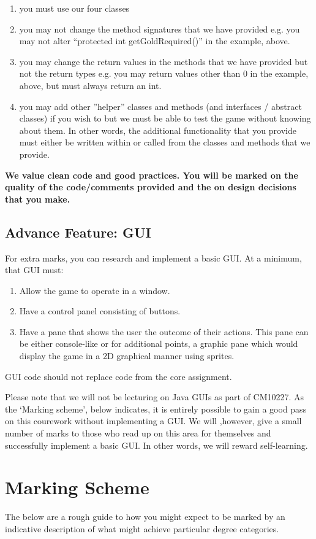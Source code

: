 \documentclass{article}
\begin{document}
{\begin{enumerate}
\item you must use our four classes
\item you may not change the method signatures that we have provided e.g. you may not alter ``protected int getGoldRequired()'' in the example, above.
\item you may change the return values in the methods that we have provided but not the return types e.g. you may return values other than 0 in the example, above, but must always return an int.
\item you may add other ''helper''  classes and methods (and interfaces / abstract classes) if you wish to but we must be able to test the game without knowing about them. In other words, the additional functionality that you provide must either be written within or called from the classes and methods that we provide.
\end{enumerate}

 \textbf{We value clean code and good practices. You will be marked on the quality of the code/comments provided and the on design decisions that you make.}

\subsection{Advance Feature: GUI}
For extra marks, you can research and implement a basic GUI. At a minimum, that GUI must:
\begin{enumerate}
\item Allow the game to operate in a window.
\item Have a control panel consisting of buttons.
\item Have a pane that shows the user the outcome of their actions. This pane can be either console-like or for additional points, a graphic pane which would display the game in a 2D graphical manner using sprites.
\end{enumerate}
GUI code should not replace code from the core assignment.

Please note that we will not be lecturing on Java GUIs as part of CM10227. As the `Marking scheme', below indicates, it is entirely possible to gain a good pass on this courework without implementing a GUI. We will ,however, give a small number of marks to those who read up on this area for themselves and successfully implement a basic GUI. In other words, we will reward self-learning. 

\section{Marking Scheme}
The below are a rough guide to how you might expect to be marked by an indicative description of what might achieve particular degree categories.

}
\end{document}
